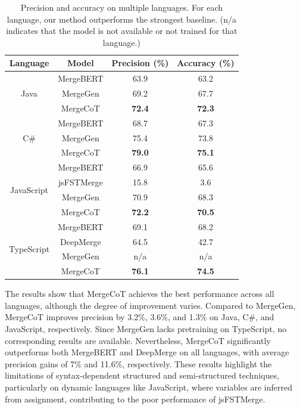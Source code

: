 \documentclass[sigconf,review,anonymous]{acmart}
\begin{document}
\begin{table}[]
\caption{Precision and accuracy on multiple languages. For each language, our method outperforms the strongest baseline. (n/a indicates that the model is not available or not trained for that language.)}
\begin{tabular}{cccc}
\hline
Language          & Model & Precision (\%) & Accuracy (\%) \\ \hline
\multirow{3}{*}{Java}       & MergeBERT      & 63.9                    & 63.2                   \\
                            & MergeGen       & 69.2                    & 67.7                   \\
                            & MergeCoT       & \textbf{72.4}           & \textbf{72.3}          \\ \hline
\multirow{3}{*}{C\#}        & MergeBERT      & 68.7                    & 67.3                   \\
                            & MergeGen       & 75.4                    & 73.8                   \\
                            & MergeCoT       & \textbf{79.0}           & \textbf{75.1}          \\ \hline
\multirow{4}{*}{JavaScript} & MergeBERT      & 66.9                    & 65.6                   \\
                            & jsFSTMerge     & 15.8                    & 3.6                    \\
                            & MergeGen       & 70.9                    & 68.3                   \\
                            & MergeCoT       & \textbf{72.2}           & \textbf{70.5}          \\ \hline
\multirow{4}{*}{TypeScript} & MergeBERT      & 69.1                    & 68.2                   \\
                            & DeepMerge      & 64.5                    & 42.7                   \\
                            & MergeGen       & n/a                     & n/a                    \\
                            & MergeCoT       & \textbf{76.1}           & \textbf{74.5}          \\ \hline
\end{tabular}
\label{tab: mutil language results}
\end{table}

The results show that MergeCoT achieves the best performance across all languages, although the degree of improvement varies. Compared to MergeGen, MergeCoT improves precision by 3.2\%, 3.6\%, and 1.3\% on Java, C\#, and JavaScript, respectively. Since MergeGen lacks pretraining on TypeScript, no corresponding results are available. Nevertheless, MergeCoT significantly outperforms both MergeBERT and DeepMerge on all languages, with average precision gains of 7\% and 11.6\%, respectively. These results highlight the limitations of syntax-dependent structured and semi-structured techniques, particularly on dynamic languages like JavaScript, where variables are inferred from assignment, contributing to the poor performance of jsFSTMerge.
\end{document}
